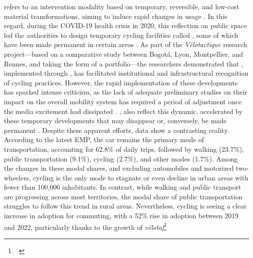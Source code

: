 \begin{refsegment}
{     refers to an intervention modality based on temporary, reversible, and low-cost material transformations, aiming to induce rapid changes in usage \textcolor{blue}{\autocite{lydon_tactical_2015}}. In this regard, during the COVID-19 health crisis in 2020, this reflection on public space led the authorities to design temporary cycling facilities called , some of which have been made permanent in certain areas \textcolor{blue}{\autocite{ortar_cycling_2024}}. As part of the \textsl{Vélotactique} research project—based on a comparative study between Bogotá, Lyon, Montpellier, and Rennes, and taking the form of a portfolio—the researchers \textcolor{blue}{\textcite[11]{chapelon_urbanisme_2023}} demonstrated that , implemented through , has facilitated institutional and infrastructural recognition of cycling practices. However, the rapid implementation of these developments has sparked intense criticism, as the lack of adequate preliminary studies on their impact on the overall mobility system has required a period of adjustment once the media excitement had dissipated \textcolor{blue}{\autocite[61]{thebert_public_2024}}.
}, also reflect this dynamic, accelerated by these temporary developments that may disappear or, conversely, be made permanent \textcolor{blue}{\autocite[11]{chapelon_urbanisme_2023}}. Despite these apparent efforts, data show a contrasting reality. According to the latest \acrfull{EMP}, the car remains the primary mode of transportation, accounting for 62.8\% of daily trips, followed by walking (23.7\%), public transportation (9.1\%), cycling (2.7\%), and other modes (1.7\%). Among the changes in these modal shares, and excluding automobiles and motorized two-wheelers, cycling is the only mode to stagnate or even decline in urban areas with fewer than 100,000 inhabitants. In contrast, while walking and public transport are progressing across most territories, the modal share of public transportation struggles to follow this trend in rural areas. Nevertheless, cycling is seeing a clear increase in adoption for commuting, with a 52\% rise in adoption between 2019 and 2022, particularly thanks to the growth of \textsl{vélotaf}\footnote{~
}
\end{refsegment}
